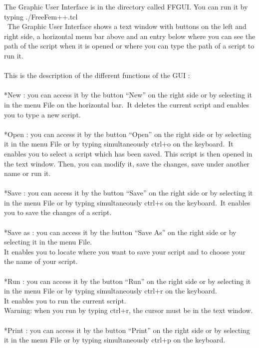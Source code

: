 \documentclass[a4paper]{report}
\begin{document}
The Graphic User Interface is in the directory called FFGUI.
You can run it by typing ./FreeFem++.tcl\\
\
The Graphic User Interface shows a text window with buttons on the left and right side, a horizontal menu bar above and an entry below where you can see the path of the script when it is opened or where you can type the path of a script to run it.\\
\\
This is the description of the different functions of the GUI :\\
\\
*New : you can access it by the button ``New'' on the right side or by selecting it in the menu File on the horizontal bar.\
It deletes the current script and enables you to type a new script.\\
\\
*Open : you can access it by the button ``Open'' on the right side or by selecting it in the menu File or by typing simultaneously ctrl+o on the keyboard.\
It enables you to select a script which has been saved. This script is then opened in the text window. Then, you can modify it, save the changes, save under another name or run it.\\
\\
*Save : you can access it by the button ``Save'' on the right side or by selecting it in the menu File or by typing simultaneously ctrl+s on the keyboard.\
It enables you to save the changes of a script.\\
\\
*Save as : you can access it by the button ``Save As'' on the right side or by selecting it in the menu File.\\
It enables you to locate where you want to save your script and to choose your the name of your script.\\
\\
*Run : you can access it by the button ``Run'' on the right side or by selecting it in the menu File or by typing simultaneously ctrl+r on the keyboard.\\
It enables you to run the current script.\\
Warning: when you run by typing ctrl+r, the cursor must be in the text window.\\
\\
*Print : you can access it by the button ``Print'' on the right side or by selecting it in the menu File or by typing simultaneously ctrl+p on the keyboard.\\
\end{document}
